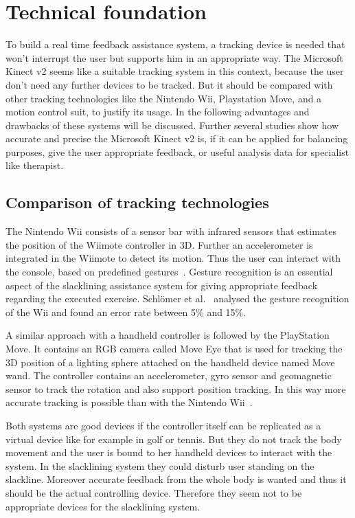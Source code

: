 \section{Technical foundation}

To build a real time feedback assistance system, a tracking device is needed that won't interrupt the user but supports him in an appropriate way. The Microsoft Kinect v2 seems like a suitable tracking system in this context, because the user don't need any further devices to be tracked. But it should be compared with other tracking technologies like the Nintendo Wii, Playstation Move, and a motion control suit, to justify its usage. In the following advantages and drawbacks of these systems will be discussed. Further several studies show how accurate and precise the Microsoft Kinect v2 is, if it can be applied for balancing purposes, give the user appropriate feedback, or useful analysis data for specialist like therapist.

\subsection{Comparison of tracking technologies}

The Nintendo Wii consists of a sensor bar with infrared sensors that estimates the position of the Wiimote controller in 3D. Further an accelerometer is integrated in the Wiimote to detect its motion. Thus the user can interact with the console, based on predefined gestures~\cite{Bogdanovych2015-ci, Tanaka2012-ACO}. Gesture recognition is an essential aspect of the slacklining assistance system for giving appropriate feedback regarding the executed exercise. Schlömer et al.~\cite{Schlomer2008-uo} analysed the gesture recognition of the Wii and found an error rate between 5\% and 15\%.

A similar approach with a handheld controller is followed by the PlayStation Move. It contains an RGB camera called Move Eye that is used for tracking the 3D position of a lighting sphere attached on the handheld device named Move wand. The controller contains an accelerometer, gyro sensor and geomagnetic sensor to track the rotation and also support position tracking. In this way more accurate tracking is possible than with the Nintendo Wii~\cite{Bogdanovych2015-ci, Tanaka2012-ACO}.

Both systems are good devices if the controller itself can be replicated as a virtual device like for example in golf or tennis. But they do not track the body movement and the user is bound to her handheld devices to interact with the system. In the slacklining system they could disturb user standing on the slackline. Moreover accurate feedback from the whole body is wanted and thus it should be the actual controlling device. Therefore they seem not to be appropriate devices for the slacklining system.

